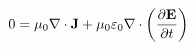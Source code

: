 \documentclass[preview]{standalone}
\begin{document}
\begin{align*}
0 = \mu_{0} \nabla \cdot \mathbf{J} + \mu_{0}\varepsilon_{0} \nabla \cdot \left(\pdv{\mathbf{E}}{t}\right)
\end{align*}
\end{document}
